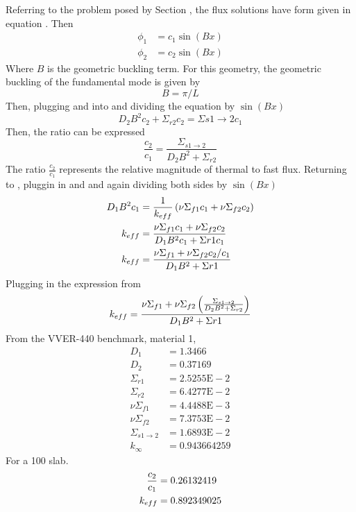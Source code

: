   Referring to the problem posed by Section , the flux 
  solutions have form given in equation . Then
  \begin{align}
    \label{eq:twogroupflux1}
    \phi_1 &= c_1 \sin(Bx) \\
    \label{eq:twogroupflux2}
    \phi_2 &= c_2 \sin(Bx)
  \end{align}
  Where $B$ is the geometric buckling term. For this geometry, the geometric 
  buckling of the fundamental mode is given by 
  \begin{equation}
    B = \pi/L
  \end{equation}
  Then, plugging   and  into 
   and dividing the equation by $\sin(Bx)$
  \begin{equation}
    D_2 B^2 c_2 + \Sigma_{r2} c_2 = \Sigma{s1\rightarrow2} c_1
  \end{equation}
  Then, the ratio can be expressed
  \begin{equation} \label{eq:fluxratio}
    \frac{c_2}{c_1} = \frac{\Sigma_{s1\rightarrow2}}{D_2 B^2 + \Sigma_{r2}}
  \end{equation}
  The ratio $\frac{c_2}{c_1}$ represents the relative magnitude of thermal to 
  fast flux. Returning to , pluggin in 
   and  and again dividing both
  sides by  $\sin(Bx)$
  \begin{align}
    D_1 B^2 c_1 &= \frac{1}{k_{eff}} \left( \nu \Sigma_{f1} c_1 + 
      \nu \Sigma_{f2} c_2\right)\\
    k_{eff} &= \frac{\nu \Sigma_{f1} c_1 + \nu \Sigma_{f2} c_2}
      {D_1 B^2 c_1 + \Sigma{r1} c_1}\\
    k_{eff} &= \frac{\nu \Sigma_{f1} + \nu \Sigma_{f2} c_2/c_1}
      {D_1 B^2 + \Sigma{r1}}
  \end{align}
  Plugging in the expression from 
  \begin{equation}
    k_{eff} = \frac{\nu \Sigma_{f1} + \nu \Sigma_{f2} 
      \left(\frac{\Sigma_{s1\rightarrow2}}{D_2B^2+\Sigma_{r2}}\right)}
      {D_1 B^2 + \Sigma{r1}}
  \end{equation}
  From the VVER-440 benchmark, material 1,
  \begin{align*}
    D_1 &= 1.3466  \\
    D_2 &= 0.37169 \\
    \Sigma_{r1} &= 2.5255\text{E}-2\\
    \Sigma_{r2} &= 6.4277\text{E}-2\\
    \nu \Sigma_{f1}  &= 4.4488\text{E}-3\\
    \nu \Sigma_{f2}  &= 7.3753\text{E}-2\\
    \Sigma_{s1\rightarrow2} &= 1.6893\text{E}-2 \\
    k_{\infty} &= 0.943664259
  \end{align*}
  For a 100  slab.
  \begin{align}
    \frac{c_2}{c_1} &= 0.26132419 \\
    k_{eff} &= 0.892349025
  \end{align}
  
